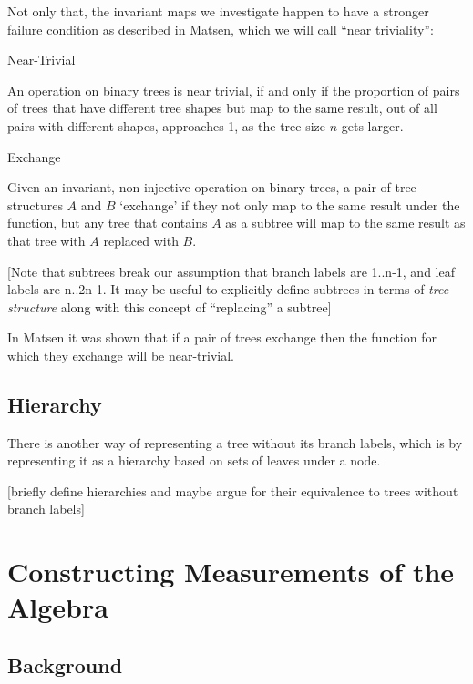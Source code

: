 \documentclass[10pt,a4paper]{report}
\begin{document}
Not only that, the invariant maps we investigate happen to have a stronger
failure condition as described in Matsen, which we will call ``near
triviality'':

\begin{definition} Near-Trivial

	An operation on binary trees is near trivial, if and only if the proportion
	of pairs of trees that have different tree shapes but map to the same
	result, out of all pairs with different shapes, approaches 1, as the tree
	size $n$ gets larger.
\end{definition}

\begin{definition} Exchange

	Given an invariant, non-injective operation on binary trees, a pair of
	tree structures $A$ and $B$ `exchange' if they not only map to the same
	result under the function, but any tree that contains $A$ as a subtree will
	map to the same result as that tree with $A$ replaced with $B$.
\end{definition}

[Note that subtrees break our assumption that branch labels are 1..n-1, and
leaf labels are n..2n-1. It may be useful to explicitly define subtrees in
terms of \emph{tree structure} along with this concept of ``replacing'' a
subtree]

In Matsen it was shown that if a pair of trees exchange then the function for
which they exchange will be near-trivial.

\section{Hierarchy}

There is another way of representing a tree without its branch labels, which is
by representing it as a hierarchy based on sets of leaves under a node.

[briefly define hierarchies and maybe argue for their equivalence to trees
without branch labels]

\chapter{Constructing Measurements of the Algebra}

\section{Background}
\end{document}
